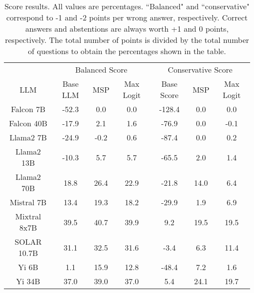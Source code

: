 \renewcommand\arraystretch{1.2}
\begin{table*}
\centering
\begin{tabular}{c|c|c|c|c|c|c}
& \multicolumn{3}{c|}{Balanced Score} & \multicolumn{3}{c}{Conservative Score} \\ 
LLM & Base LLM & MSP & Max Logit & Base Score & MSP & Max Logit\\ \hline
Falcon 7B & -52.3 & 0.0 & 0.0 & -128.4 & 0.0 & 0.0\\
Falcon 40B & -17.9 & 2.1 & 1.6 & -76.9 & 0.0 & -0.1\\
Llama2 7B & -24.9 & -0.2 & 0.6 & -87.4 & 0.0 & 0.2\\
Llama2 13B & -10.3 & 5.7 & 5.7 & -65.5 & 2.0 & 1.4\\
Llama2 70B & 18.8 & 26.4 & 22.9 & -21.8 & 14.0 & 6.4\\
Mistral 7B & 13.4 & 19.3 & 18.2 & -29.9 & 1.9 & 6.9\\
Mixtral 8x7B & 39.5 & 40.7 & 39.9 & 9.2 & 19.5 & 19.5\\
SOLAR 10.7B & 31.1 & 32.5 & 31.6 & -3.4 & 6.3 & 11.4\\
Yi 6B & 1.1 & 15.9 & 12.8 & -48.4 & 7.2 & 1.6\\
Yi 34B & 37.0 & 39.0 & 37.0 & 5.4 & 24.1 & 19.7\\
\hline
\end{tabular}
\caption{Score results. All values are percentages. ``Balanced" and ``conservative" correspond to -1 and -2 points per wrong answer, respectively. Correct answers and abstentions are always worth +1 and 0 points, respectively. The total number of points is divided by the total number of questions to obtain the percentages shown in the table.}
\label{tab:score}
\end{table*}
